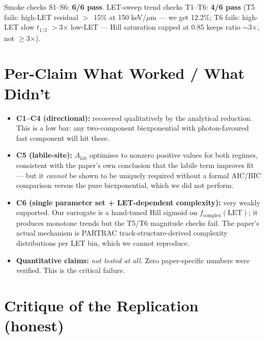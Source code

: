\documentclass[11pt]{article}
\begin{document}
\vspace{1em}

Smoke checks S1--S6: \textbf{6/6 pass}. LET-sweep trend checks T1--T6:
\textbf{4/6 pass} (T5 fails: high-LET residual $>$~15\% at 150 keV/$\mu$m ---
we get 12.2\%; T6 fails: high-LET slow $t_{1/2}$ $>$3$\times$ low-LET ---
Hill saturation capped at 0.85 keeps ratio $\sim$3$\times$, not $\ge$3$\times$).

\section{Per-Claim What Worked / What Didn't}
\begin{itemize}
\item \textbf{C1--C4 (directional):} recovered qualitatively by the analytical reduction.  This is a low bar: any two-component biexponential with photon-favoured fast component will hit these.
\item \textbf{C5 (labile-site):} $A_{\text{lab}}$ optimises to nonzero positive values for both regimes, consistent with the paper's own conclusion that the labile term improves fit --- but it \emph{cannot} be shown to be uniquely required without a formal AIC/BIC comparison versus the pure biexponential, which we did not perform.
\item \textbf{C6 (single parameter set + LET-dependent complexity):} very weakly supported. Our surrogate is a hand-tuned Hill sigmoid on $f_{\text{complex}}(\text{LET})$; it produces monotone trends but the T5/T6 magnitude checks fail. The paper's actual mechanism is PARTRAC track-structure-derived complexity distributions per LET bin, which we cannot reproduce.
\item \textbf{Quantitative claims:} \emph{not tested at all.} Zero paper-specific numbers were verified. This is the critical failure.
\end{itemize}

\section{Critique of the Replication (honest)}
\end{document}
